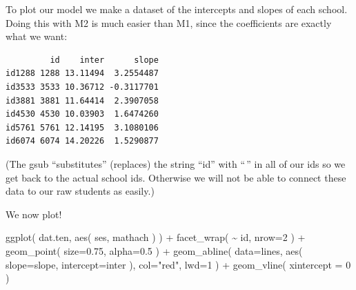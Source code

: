 \documentclass[
  letterpaper,
  DIV=11,
  numbers=noendperiod]{scrreprt}
\newenvironment{Shaded}{\begin{snugshade}}{\end{snugshade}}
\newcommand{\AttributeTok}[1]{\textcolor[rgb]{0.49,0.56,0.16}{#1}}
\newcommand{\CommentTok}[1]{\textcolor[rgb]{0.38,0.63,0.69}{\textit{#1}}}
\newcommand{\DecValTok}[1]{\textcolor[rgb]{0.25,0.63,0.44}{#1}}
\newcommand{\FloatTok}[1]{\textcolor[rgb]{0.25,0.63,0.44}{#1}}
\newcommand{\FunctionTok}[1]{\textcolor[rgb]{0.02,0.16,0.49}{#1}}
\newcommand{\NormalTok}[1]{\textcolor[rgb]{0.00,0.44,0.13}{#1}}
\newcommand{\OtherTok}[1]{\textcolor[rgb]{0.00,0.44,0.13}{#1}}
\newcommand{\SpecialCharTok}[1]{\textcolor[rgb]{0.25,0.44,0.63}{#1}}
\newcommand{\StringTok}[1]{\textcolor[rgb]{0.25,0.44,0.63}{#1}}
\begin{document}
To plot our model we make a dataset of the intercepts and slopes of each
school. Doing this with M2 is much easier than M1, since the
coefficients are exactly what we want:

\begin{Shaded}
\end{Shaded}

\begin{verbatim}
         id    inter      slope
id1288 1288 13.11494  3.2554487
id3533 3533 10.36712 -0.3117701
id3881 3881 11.64414  2.3907058
id4530 4530 10.03903  1.6474260
id5761 5761 12.14195  3.1080106
id6074 6074 14.20226  1.5290877
\end{verbatim}

(The gsub ``substitutes'' (replaces) the string ``id'' with ``\,'' in
all of our ids so we get back to the actual school ids. Otherwise we
will not be able to connect these data to our raw students as easily.)

We now plot!

\begin{Shaded}
\begin{Highlighting}[]
\FunctionTok{ggplot}\NormalTok{( dat.ten, }\FunctionTok{aes}\NormalTok{( ses, mathach ) ) }\SpecialCharTok{+}
    \FunctionTok{facet\_wrap}\NormalTok{( }\SpecialCharTok{\textasciitilde{}}\NormalTok{ id, }\AttributeTok{nrow=}\DecValTok{2}\NormalTok{ ) }\SpecialCharTok{+}
    \FunctionTok{geom\_point}\NormalTok{( }\AttributeTok{size=}\FloatTok{0.75}\NormalTok{, }\AttributeTok{alpha=}\FloatTok{0.5}\NormalTok{ ) }\SpecialCharTok{+}
    \FunctionTok{geom\_abline}\NormalTok{( }\AttributeTok{data=}\NormalTok{lines, }\FunctionTok{aes}\NormalTok{( }\AttributeTok{slope=}\NormalTok{slope, }
                                  \AttributeTok{intercept=}\NormalTok{inter ), }
                 \AttributeTok{col=}\StringTok{"red"}\NormalTok{, }\AttributeTok{lwd=}\DecValTok{1}\NormalTok{ ) }\SpecialCharTok{+}
    \FunctionTok{geom\_vline}\NormalTok{( }\AttributeTok{xintercept =} \DecValTok{0}\NormalTok{ )}
\end{Highlighting}
\end{Shaded}
\end{document}
